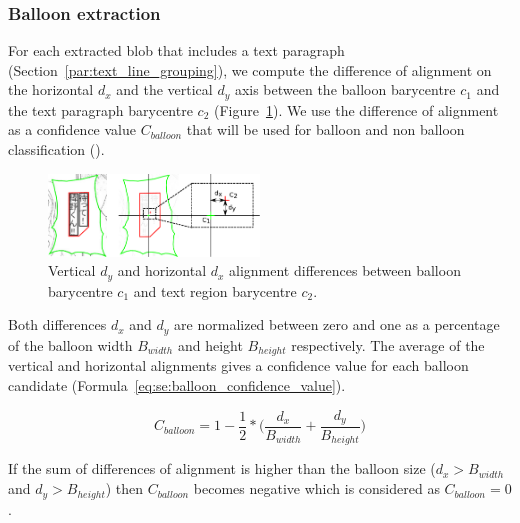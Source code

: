 

\subsubsection{Balloon extraction} %
\label{par:balloon_extraction}

For each extracted blob that includes a text paragraph (Section~\ref{par:text_line_grouping}), we compute the difference of alignment on the horizontal $d_x$ and the vertical $d_y$ axis between the balloon barycentre $c_1$ and the text paragraph barycentre $c_2$ (Figure~\ref{fig:se:align_diff}).
We use the difference of alignment as a confidence value $C_{balloon}$ that will be used for balloon and non balloon classification ().

	\begin{figure}[h!]	%
	  \centering
		\includegraphics[trim= 140px 0px 0px 0px, clip, width=0.5\textwidth]{text_balloon_alignment.pdf}
		\caption[Illustration of the vertical and horizontal alignment differences between balloon and text region barycentre]{Vertical $d_y$ and horizontal $d_x$ alignment differences between balloon barycentre $c_1$ and text region barycentre $c_2$.}
		\label{fig:se:align_diff}
	\end{figure}

Both differences $d_x$ and $d_y$ are normalized between zero and one as a percentage of the balloon width $B_{width}$ and height $B_{height}$ respectively.
The average of the vertical and horizontal alignments gives a confidence value for each balloon candidate (Formula~\ref{eq:se:balloon_confidence_value}).


\begin{equation}
	\label{eq:se:balloon_confidence_value}
	C_{balloon} = 1 - \frac{1}{2} *  \bigg( \frac{d_x}{B_{width}} + \frac{d_y}{B_{height}} \bigg)
\end{equation}

If the sum of differences of alignment is higher than the balloon size ($d_x > B_{width}$ and $d_y > B_{height}$) then $C_{balloon}$ becomes negative which is considered as $C_{balloon}=0$.




